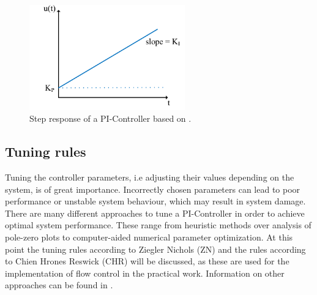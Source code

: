 \begin{figure}[h]
   \centering
   \includegraphics[width=0.6\textwidth]{images/step_resp_pi.pdf}
   \caption[Step response of a PI-Controller]{Step response of a PI-Controller based on \cite{Reg_17}.}
   \label{fig:step_resp_pi}
 \end{figure}

\subsection{Tuning rules}
Tuning the controller parameters, i.e adjusting their values depending on the system, is of great importance. Incorrectly chosen parameters can lead to poor performance or unstable system behaviour, which may result in system damage. There are many different approaches to tune a PI-Controller in order to achieve optimal system performance. These range from heuristic methods over analysis of pole-zero plots to computer-aided numerical parameter optimization. \cite{Reg_10} At this point the tuning rules according to Ziegler Nichols (ZN) and the rules according to Chien Hrones Reswick (CHR) will be discussed, as these are used for the implementation of flow control in the practical work.  Information on other approaches can be found in \cite{Reg_11}.

